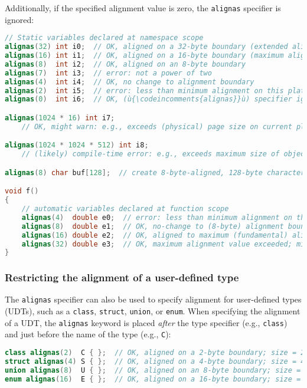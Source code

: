 \noindent Additionally, if the specified alignment value is zero, the
\texttt{alignas} specifier is ignored:

\begin{lstlisting}[language=C++]
// Static variables declared at namespace scope
alignas(32) int i0;  // OK, aligned on a 32-byte boundary (extended alignment)
alignas(16) int i1;  // OK, aligned on a 16-byte boundary (maximum alignment)
alignas(8)  int i2;  // OK, aligned on an 8-byte boundary
alignas(7)  int i3;  // error: not a power of two
alignas(4)  int i4;  // OK, no change to alignment boundary
alignas(2)  int i5;  // error: less than minimum alignment on this platform
alignas(0)  int i6;  // OK, (ù{\codeincomments{alignas}}ù) specifier ignored

alignas(1024 * 16) int i7;
    // OK, might warn: e.g., exceeds (physical) page size on current platform

alignas(1024 * 1024 * 512) int i8;
    // (likely) compile-time error: e.g., exceeds maximum size of object file

alignas(8) char buf[128];  // create 8-byte-aligned, 128-byte character buffer

void f()
{
    // automatic variables declared at function scope
    alignas(4)  double e0;  // error: less than minimum alignment on this platform
    alignas(8)  double e1;  // OK, no-change to (8-byte) alignment boundary
    alignas(16) double e2;  // OK, aligned to maximum (fundamental) alignment value
    alignas(32) double e3;  // OK, maximum alignment value exceeded; might warn
}
\end{lstlisting}

\subsubsection[Restricting the alignment of a user-defined type]{Restricting the alignment of a user-defined type}\label{restricting-the-alignment-of-a-user-defined-type}

The \texttt{alignas} specifier can also be used to specify alignment for
user-defined types (UDTs), such as a \texttt{class}, \texttt{struct},
\texttt{union}, or \texttt{enum}. When specifying the alignment of a UDT,
 the \texttt{alignas} keyword is placed \emph{after} the
type specifier (e.g., \texttt{class}) and just before the name of the
type (e.g., \texttt{C}):

\begin{lstlisting}[language=C++]
class alignas(2)  C { };  // OK, aligned on a 2-byte boundary; size = 2
struct alignas(4) S { };  // OK, aligned on a 4-byte boundary; size = 4
union alignas(8)  U { };  // OK, aligned on an 8-byte boundary; size = 8
enum alignas(16)  E { };  // OK, aligned on a 16-byte boundary; size = 4
\end{lstlisting}

